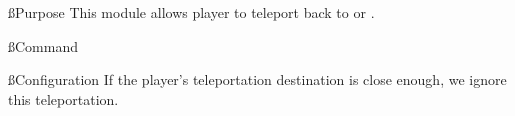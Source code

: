 \ss{Purpose}
This module allows player to teleport back to  or .

\ss{Command}

\ss{Configuration}
If the player's teleportation destination is close enough, we ignore this teleportation.



